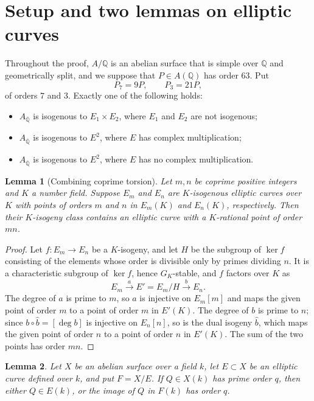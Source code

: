 \documentclass[11pt]{article}
\newtheorem{lemma}{Lemma}
\newcommand{\Q}{\mathbb Q}
\begin{document}
\section{Setup and two lemmas on elliptic curves}\label{sec:setup}

Throughout the proof, \(A/\Q\) is an abelian surface that is simple over
\(\Q\) and geometrically split, and we suppose that \(P\in A(\Q)\) has
order \(63\). Put
\[
 P_7=9P,\qquad P_3=21P,
\]
of orders \(7\) and \(3\). Exactly one of the following holds:
\begin{itemize}
\item[(N)] \(A_{\overline{\Q}}\) is isogenous to \(E_1\times E_2\),
where \(E_1\) and \(E_2\) are not isogenous;
\item[(CM)] \(A_{\overline{\Q}}\) is isogenous to \(E^2\), where \(E\)
has complex multiplication;
\item[(S)] \(A_{\overline{\Q}}\) is isogenous to \(E^2\), where \(E\)
has no complex multiplication.
\end{itemize}

\begin{lemma}[Combining coprime torsion]\label{lem:combine}
Let \(m,n\) be coprime positive integers and \(K\) a number field.
Suppose \(E_m\) and \(E_n\) are \(K\)-isogenous elliptic curves over
\(K\) with points of orders \(m\) and \(n\) in \(E_m(K)\) and
\(E_n(K)\), respectively. Then their \(K\)-isogeny class contains an
elliptic curve with a \(K\)-rational point of order \(mn\).
\end{lemma}

\begin{proof}
Let \(f:E_m\to E_n\) be a \(K\)-isogeny, and let \(H\) be the subgroup
of \(\ker f\) consisting of the elements whose order is divisible only
by primes dividing \(n\). It is a characteristic subgroup of \(\ker f\),
hence \(G_K\)-stable, and \(f\) factors over \(K\) as
\[
 E_m\xrightarrow{\ a\ }E'=E_m/H\xrightarrow{\ b\ }E_n .
\]
The degree of \(a\) is prime to \(m\), so \(a\) is injective on
\(E_m[m]\) and maps the given point of order \(m\) to a point of order
\(m\) in \(E'(K)\). The degree of \(b\) is prime to \(n\); since
\(b\circ\hat b=[\deg b]\) is injective on \(E_n[n]\), so is the dual
isogeny \(\hat b\), which maps the given point of order \(n\) to a point
of order \(n\) in \(E'(K)\). The sum of the two points has order
\(mn\).
\end{proof}

\begin{lemma}\label{lem:sequence}
Let \(X\) be an abelian surface over a field \(k\), let \(E\subset X\)
be an elliptic curve defined over \(k\), and put \(F=X/E\). If
\(Q\in X(k)\) has prime order \(q\), then either \(Q\in E(k)\), or the
image of \(Q\) in \(F(k)\) has order \(q\).
\end{lemma}
\end{document}
